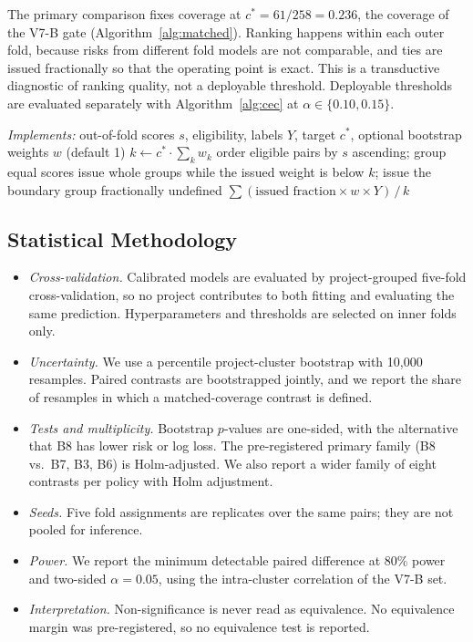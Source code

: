 The primary comparison fixes coverage at $c^\ast=61/258=0.236$, the coverage of the V7-B gate (Algorithm~\ref{alg:matched}). Ranking happens within each outer fold, because risks from different fold models are not comparable, and ties are issued fractionally so that the operating point is exact. This is a transductive diagnostic of ranking quality, not a deployable threshold. Deployable thresholds are evaluated separately with Algorithm~\ref{alg:cec} at $\alpha\in\{0.10,0.15\}$.

\begin{algorithm}[!t]
\caption{Matched-coverage risk}
\label{alg:matched}
\small
\begin{algorithmic}[1]
\Statex \textit{Implements:} 
\Require out-of-fold scores $s$, eligibility, labels $Y$, target $c^\ast$, optional bootstrap weights $w$ (default 1)
\State $k\gets c^\ast\cdot\sum_k w_k$ 
\State order eligible pairs by $s$ ascending; group equal scores
\State issue whole groups while the issued weight is below $k$; issue the boundary group fractionally
 \Return undefined 
\EndIf
\State \Return $\sum(\text{issued fraction}\times w\times Y)\,/\,k$
\end{algorithmic}
\end{algorithm}

\subsection{Statistical Methodology}
\begin{itemize}
\item \emph{Cross-validation.} Calibrated models are evaluated by project-grouped five-fold cross-validation, so no project contributes to both fitting and evaluating the same prediction. Hyperparameters and thresholds are selected on inner folds only.
\item \emph{Uncertainty.} We use a percentile project-cluster bootstrap with 10{,}000 resamples. Paired contrasts are bootstrapped jointly, and we report the share of resamples in which a matched-coverage contrast is defined.
\item \emph{Tests and multiplicity.} Bootstrap $p$-values are one-sided, with the alternative that B8 has lower risk or log loss. The pre-registered primary family (B8 vs.\ B7, B3, B6) is Holm-adjusted. We also report a wider family of eight contrasts per policy with Holm adjustment.
\item \emph{Seeds.} Five fold assignments are replicates over the same pairs; they are not pooled for inference.
\item \emph{Power.} We report the minimum detectable paired difference at 80\% power and two-sided $\alpha=0.05$, using the intra-cluster correlation of the V7-B \NDO{} set.
\item \emph{Interpretation.} Non-significance is never read as equivalence. No equivalence margin was pre-registered, so no equivalence test is reported.
\end{itemize}

